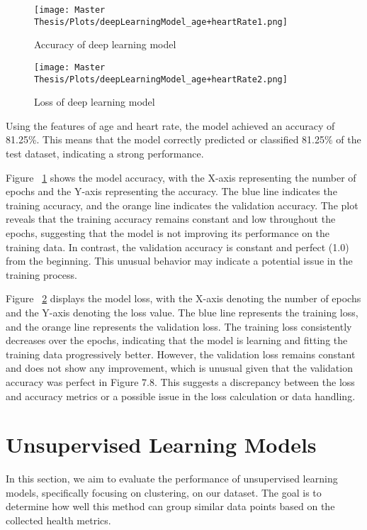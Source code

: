 \FloatBarrier
\begin{figure}[h!]
\centering
\texttt{[image: Master Thesis/Plots/deepLearningModel\_age+heartRate1.png]}
\caption{Accuracy of deep learning model}
\label{figure:modelaccNN}
\end{figure}
\FloatBarrier

\FloatBarrier
\begin{figure}[h!]
\centering
\texttt{[image: Master Thesis/Plots/deepLearningModel\_age+heartRate2.png]}
\caption{Loss of deep learning model}
\label{figure:modellossNN}
\end{figure}
\FloatBarrier

Using the features of age and heart rate, the model achieved an accuracy of 81.25\%. This means that the model correctly predicted or classified 81.25$\%$ of the test dataset, indicating a strong performance. 

Figure ~\ref{figure:modelaccNN} shows the model accuracy, with the X-axis representing the number of epochs and the Y-axis representing the accuracy. The blue line indicates the training accuracy, and the orange line indicates the validation accuracy. The plot reveals that the training accuracy remains constant and low throughout the epochs, suggesting that the model is not improving its performance on the training data. In contrast, the validation accuracy is constant and perfect (1.0) from the beginning. This unusual behavior may indicate a potential issue in the training process.

Figure ~\ref{figure:modellossNN} displays the model loss, with the X-axis denoting the number of epochs and the Y-axis denoting the loss value. The blue line represents the training loss, and the orange line represents the validation loss. The training loss consistently decreases over the epochs, indicating that the model is learning and fitting the training data progressively better. However, the validation loss remains constant and does not show any improvement, which is unusual given that the validation accuracy was perfect in Figure 7.8. This suggests a discrepancy between the loss and accuracy metrics or a possible issue in the loss calculation or data handling. 

\section{Unsupervised Learning Models}

In this section, we aim to evaluate the performance of unsupervised learning models, specifically focusing on clustering, on our dataset. The goal is to determine how well this method can group similar data points based on the collected health metrics.

